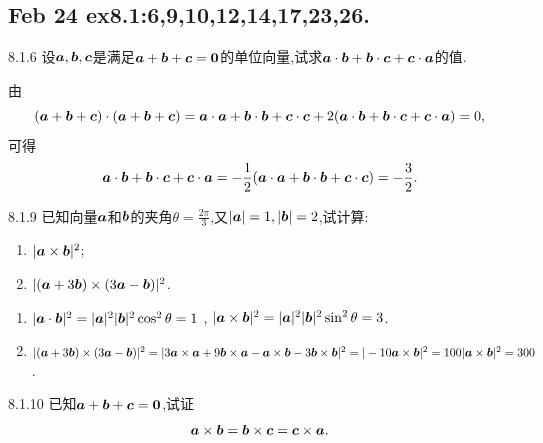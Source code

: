 \setcounter{chapter}{0}
\chapter{}

\section{Feb 24 ex8.1:6,9,10,12,14,17,23,26.}

\begin{exercise}{8.1.6}
    设$\bm{a},\bm{b},\bm{c}$是满足$\bm{a} + \bm{b} + \bm{c} =\mathbf{0}$的单位向量,试求$\bm{a} \cdot \bm{b} + \bm{b} \cdot \bm{c} + \bm{c} \cdot \bm{a}$的值.
\end{exercise}

\begin{solution}
    由
    $$
    (\bm{a} + \bm{b} + \bm{c}) \cdot (\bm{a} + \bm{b} + \bm{c}) = \bm{a} \cdot \bm{a} + \bm{b} \cdot \bm{b} + \bm{c} \cdot \bm{c} + 2(\bm{a} \cdot \bm{b} + \bm{b} \cdot \bm{c} + \bm{c} \cdot \bm{a}) = 0,
    $$可得
    $$
    \bm{a} \cdot \bm{b} + \bm{b} \cdot \bm{c} + \bm{c} \cdot \bm{a} = -\frac{1}{2}(\bm{a} \cdot \bm{a} + \bm{b} \cdot \bm{b} + \bm{c} \cdot \bm{c}) = -\frac{3}{2}.
    $$
\end{solution}

\begin{exercise}{8.1.9}
    已知向量$\bm{a}$和$\bm{b}$的夹角$\theta = \frac{2 \pi}{3}$,又$|\bm{a}| = 1,|\bm{b}| = 2$,试计算:
    \begin{multicols}{2}
        \begin{enumerate}
            \item $|\bm{a} \times \bm{b}|^2$;
            \item $|(\bm{a} + 3\bm{b}) \times (3\bm{a} -\bm{b})|^2$.
        \end{enumerate}
    \end{multicols}
\end{exercise}

\begin{solution}
    \begin{enumerate}
        \item $|\bm{a} \cdot \bm{b}|^2 = |\bm{a}|^2|\bm{b}|^2\cos^2\theta = 1$ , $|\bm{a} \times \bm{b}|^2 = |\bm{a}|^2|\bm{b}|^2\sin^2\theta = 3$.
        \item $|(\bm{a} + 3\bm{b}) \times (3\bm{a} -\bm{b})|^2 = |3\bm{a} \times \bm{a} + 9\bm{b} \times \bm{a} - \bm{a} \times \bm{b} - 3 \bm{b} \times \bm{b}|^2 = |-10 \bm{a} \times \bm{b}|^2 = 100|\bm{a} \times \bm{b}|^2 = 300$.
    \end{enumerate}
\end{solution}

\begin{exercise}{8.1.10}
    已知$\bm{a} + \bm{b} + \bm{c} = \mathbf{0}$,试证$$\bm{a} \times \bm{b} = \bm{b} \times \bm{c} = \bm{c} \times \bm{a}.$$
\end{exercise}

